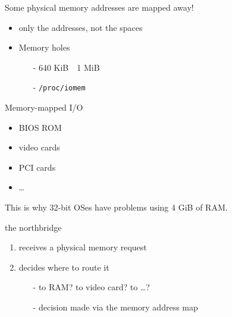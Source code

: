 \begin{frame}[plain]
  \begin{minipage}{.65\linewidth}
    \begin{block}{Some physical memory addresses are mapped away!}
      \begin{itemize}
      \item only the addresses, not the spaces
      \item Memory holes
        \begin{itemize}
        \item[-] 640 KiB~~1 MiB
        \item[-] \texttt{/proc/iomem}
        \end{itemize}
      \end{itemize}
    \end{block}
    \begin{block}{Memory-mapped I/O}
      \begin{itemize}
      \item BIOS ROM
      \item video cards
      \item PCI cards
      \item \ldots
      \end{itemize}
      This is why 32-bit OSes have problems using 4 GiB of RAM.
    \end{block}
  \end{minipage}\quad
  \begin{minipage}{.3\linewidth}
  \end{minipage}
\end{frame}

\begin{frame}
  \begin{block}{the northbridge}
    \begin{enumerate}
    \item receives a physical memory request
    \item decides where to route it
      \begin{itemize}
      \item[-] to RAM? to video card? to \ldots{}?
      \item[-] decision made via the \alert{memory address map}
      \end{itemize}
    \end{enumerate}
  \end{block}
\end{frame}

